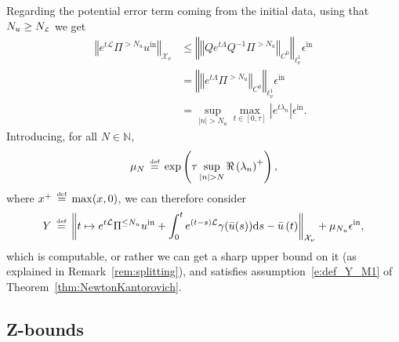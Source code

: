 \documentclass[10pt,a4paper]{article}
\theoremstyle{plain}
\newcommand{\NN}{\mathbb N}
\renewcommand{\L}{\mathcal{L}}
\newcommand{\X}{\mathcal{X}}
\newcommand{\bu}{\bar{u}}
\newcommand{\1}{\mathbf{1}}
\newcommand{\uin}{{u^{\mathrm{in}}}}
\newcommand{\bydef}{\,\stackrel{\mbox{\tiny\textnormal{\raisebox{0ex}[0ex][0ex]{def}}}}{=}\,}
\newcommand{\Nu}{N_{u}}
\newcommand{\NL}{N_{\text{\tiny{$\L$}}}}
\newcommand{\Nin}{\Nu}
\begin{document}
Regarding the potential error term coming from the initial data, using that $\Nin\geq \NL$ we get
\begin{align*}
\left\Vert e^{ t \L} \Pi^{> \Nin}\uin \right\Vert_{\X_\nu} &\leq \left\Vert \left\Vert Qe^{ t \Lambda} Q^{-1}\Pi^{> \Nin}\right\Vert_{C^0} \right\Vert_{\ell^1_\nu} \epsilon^{\mathrm{in}} \\
&= \left\Vert \left\Vert e^{ t \Lambda} \Pi^{> \Nin}\right\Vert_{C^0} \right\Vert_{\ell^1_\nu} \epsilon^{\mathrm{in}} \\
&= \sup_{\vert n\vert > \Nin} \max_{t\in[0,\tau]} \left\vert e^{t\lambda_n}\right\vert \epsilon^{\mathrm{in}} .
\end{align*}
Introducing, for all $N\in\NN$,
\begin{align}
\label{eq:mu}
\mu_N \bydef \exp \left( \tau \sup_{\vert n\vert > N} \Re\left(\lambda_n\right)^+ \right),
\end{align}
where $x^+ \bydef \max(x,0)$, we can therefore consider
\begin{align*}
Y \bydef \left\Vert t\mapsto e^{ t \L} \Pi^{\leq \Nin}\uin +  \int_{0}^{t} e^{(t-s)\L } 
		\gamma(\bu(s)) \mbox{d} s - \bu \left( t \right) \right\Vert_{\X_\nu} + \mu_{\Nin} \epsilon^{\mathrm{in}},
\end{align*}
which is computable, or rather we can get a sharp upper bound on it (as explained in Remark~\ref{rem:splitting}), and satisfies assumption~\eqref{e:def_Y_M1} of Theorem~\ref{thm:NewtonKantorovich}.


\subsection{Z-bounds}
\label{sec:Zbounds}
\end{document}

